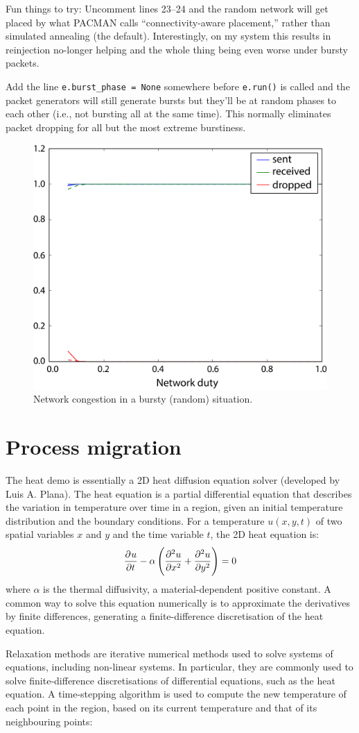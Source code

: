 \documentclass[a4paper, 11pt]{article}
\newlength\drop
\begin{document}
Fun things to try: Uncomment lines 23--24 and the random network will get placed by what PACMAN calls ``connectivity-aware placement,'' rather than simulated annealing (the default). Interestingly, on my system this results in reinjection no-longer helping and the whole thing being even worse under bursty packets.

Add the line \verb|e.burst_phase = None| somewhere before \verb|e.run()| is called and the packet generators will still generate bursts but they'll be at random phases to each other (i.e., not bursting all at the same time). This normally eliminates packet dropping for all but the most extreme burstiness.

\begin{figure}[htbp]
	\centering
	\includegraphics[width=0.5\linewidth]{images/bursting_random.pdf}
	\caption{Network congestion in a bursty (random) situation.}	
	\label{fig:bursting_random}
\end{figure}

\clearpage
\section{Process migration}
The heat demo is essentially a 2D heat diffusion equation solver (developed by Luis A. Plana). The heat equation is a partial differential equation that describes the variation in temperature over time in a region, given an initial temperature distribution and the boundary conditions. For a temperature $u(x,y,t)$ of two spatial variables $x$ and $y$ and the time variable $t$, the 2D heat equation is:
\[
\dpd{u}{t} -\alpha\left( \dpd[2]{u}{x} + \dpd[2]{u}{y} \right) = 0 
\]
where $\alpha$ is the thermal diffusivity, a material-dependent positive constant. A common way to solve this equation numerically is to approximate the derivatives by finite differences, generating a finite-difference discretisation of the heat equation.

Relaxation methods are iterative numerical methods used to solve systems of equations, including non-linear systems. In particular, they are commonly used to solve finite-difference discretisations of differential equations, such as the heat equation. A time-stepping algorithm is used to compute the new temperature of each point in the region, based on its current temperature and that of its neighbouring points:
\end{document}
